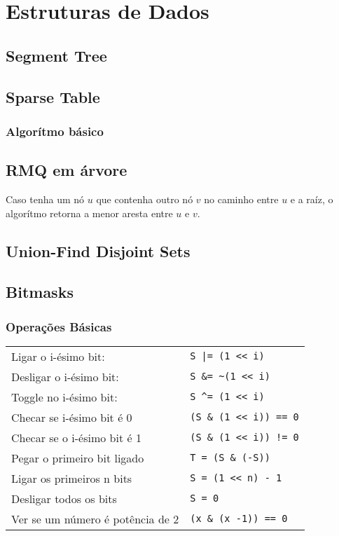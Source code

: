 \section{Estruturas de Dados}

\subsection{Segment Tree}
\divisor

\subsection{Sparse Table}
\subsubsection{Algor\'{i}tmo b\'{a}sico}
\divisor

\subsection{RMQ em \'{a}rvore}
Caso tenha um n\'{o} $u$ que contenha outro n\'{o} $v$ no caminho entre $u$ e a ra\'{i}z, o algor\'{i}tmo retorna a menor aresta entre $u$ e $v$.
\divisor

\subsection{Union-Find Disjoint Sets}
\divisor

\subsection{Bitmasks}
\subsubsection{Operações Básicas}
\begin{tabular}{l | l}
		Ligar o i-ésimo bit: 		&   \texttt{S |= (1 << i)} 			\\
		Desligar o i-ésimo bit: 	&	\texttt{S \&= \textasciitilde(1 << i)} 		\\
		Toggle no i-ésimo bit:		&   \texttt{S \textasciicircum= (1 << i)} 			\\
		Checar se i-ésimo bit é 0  	&	\texttt{(S \& (1 << i)) == 0} 	\\
		Checar se o i-ésimo bit é 1 &	\texttt{(S \& (1 << i)) != 0} 	\\
		Pegar o primeiro bit ligado	& 	\texttt{T = (S \& (-S))} 		\\
		Ligar os primeiros n bits	& 	\texttt{S = (1 << n) - 1} 		\\
		Desligar todos os bits		& 	\texttt{S = 0} \\
		Ver se um número é potência de 2 & \texttt{(x \& (x -1)) == 0}
\end{tabular}

